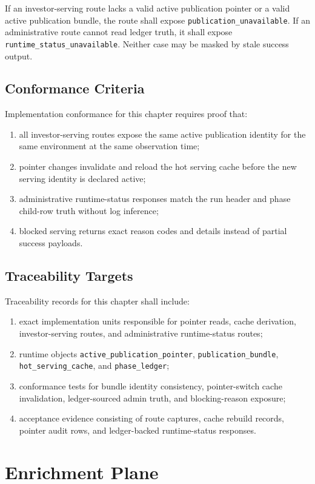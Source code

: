 \documentclass[11pt]{report}
\begin{document}
If an investor-serving route lacks a valid active publication pointer or a valid active publication bundle, the route shall expose \texttt{publication\_unavailable}. If an administrative route cannot read ledger truth, it shall expose \texttt{runtime\_status\_unavailable}. Neither case may be masked by stale success output.

\section{Conformance Criteria}
Implementation conformance for this chapter requires proof that:
\begin{enumerate}[leftmargin=1.2cm]
    \item all investor-serving routes expose the same active publication identity for the same environment at the same observation time;
    \item pointer changes invalidate and reload the hot serving cache before the new serving identity is declared active;
    \item administrative runtime-status responses match the run header and phase child-row truth without log inference;
    \item blocked serving returns exact reason codes and details instead of partial success payloads.
\end{enumerate}

\section{Traceability Targets}
Traceability records for this chapter shall include:
\begin{enumerate}[leftmargin=1.2cm]
    \item exact implementation units responsible for pointer reads, cache derivation, investor-serving routes, and administrative runtime-status routes;
    \item runtime objects \texttt{active\_publication\_pointer}, \texttt{publication\_bundle}, \texttt{hot\_serving\_cache}, and \texttt{phase\_ledger};
    \item conformance tests for bundle identity consistency, pointer-switch cache invalidation, ledger-sourced admin truth, and blocking-reason exposure;
    \item acceptance evidence consisting of route captures, cache rebuild records, pointer audit rows, and ledger-backed runtime-status responses.
\end{enumerate}
\chapter{Enrichment Plane}
\end{document}
